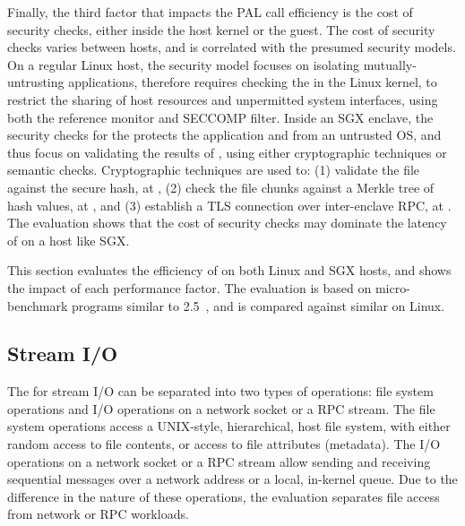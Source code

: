 Finally, the third factor that impacts the PAL call efficiency
is the cost of security checks,
either inside the host kernel or the guest.
The cost of security checks varies between hosts, and is correlated with the presumed security models.
On a regular Linux host, the security model
focuses on isolating mutually-untrusting applications,
therefore requires checking
the \hostapis{} in the Linux kernel,
to restrict the sharing of host resources and unpermitted system interfaces,
using both the reference monitor and SECCOMP filter.
Inside an SGX enclave, the security checks
for the \hostapis{}
protects the application and \libos{} from an untrusted OS,
and thus focus on validating the results of \linuxapis{},
using either cryptographic techniques or semantic checks.
Cryptographic techniques are used to: (1) validate the file against the secure hash, at , (2) check the file chunks against a Merkle tree of hash values, at , and (3) establish a TLS connection over inter-enclave RPC, at .
The evaluation shows
that the cost of security checks
may dominate the latency of \hostapis{} on a host like SGX. 


This section evaluates the efficiency of \hostapis{} on both Linux and SGX hosts, and shows the impact of each performance factor.
The evaluation is based on micro-benchmark programs similar to \lmbench{} 2.5~\cite{McVoy:lmbench},
and is compared against
similar \linuxapis{} on Linux.



\subsection{Stream I/O}


The \hostapis{} for stream I/O can be separated into two types of operations:
file system operations and I/O operations on a network socket or a RPC stream.
The file system operations
access a UNIX-style, hierarchical, host file system,
with either random access to file contents,
or access to file attributes (metadata).
The I/O operations on a network socket or a RPC stream
allow sending and receiving sequential messages over a network address or a local, in-kernel queue.
Due to the difference in the nature of these operations,
the evaluation separates
file access from network or RPC workloads.




